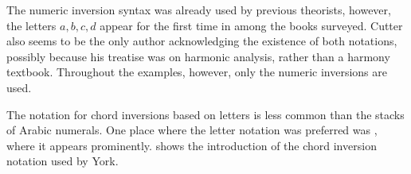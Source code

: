 The numeric inversion syntax was already used by previous
theorists, however, the letters ${a, b, c , d}$ appear for
the first time in \textcite{cutter1902harmonic} among the
books surveyed. Cutter also seems to be the only author
acknowledging the existence of both notations, possibly
because his treatise was on harmonic analysis, rather than a
harmony textbook. Throughout the examples, however, only the
numeric inversions are used.



The notation for chord inversions based on letters is less
common than the stacks of Arabic numerals. One place where
the letter notation was preferred was
\textcite{york1909practical}, where it appears prominently.
 shows the
introduction of the chord inversion notation used by York.
